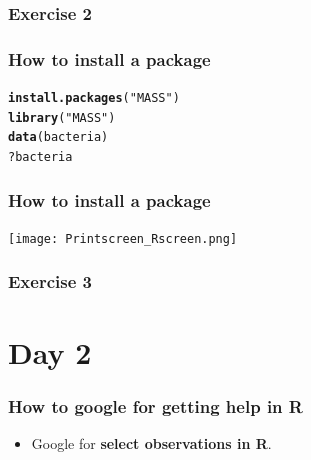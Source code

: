 \documentclass{beamer}\usepackage[]{graphicx}\usepackage[]{color}
\makeatletter
\newcommand{\hlstr}[1]{\textcolor[rgb]{0.192,0.494,0.8}{#1}}%
\newcommand{\hlopt}[1]{\textcolor[rgb]{0,0,0}{#1}}%
\newcommand{\hlstd}[1]{\textcolor[rgb]{0.345,0.345,0.345}{#1}}%
\newcommand{\hlkwd}[1]{\textcolor[rgb]{0.737,0.353,0.396}{\textbf{#1}}}%
\newenvironment{kframe}{%
 \def\at@end@of@kframe{}%
 \ifinner\ifhmode%
  \def\at@end@of@kframe{\end{minipage}}%
  \begin{minipage}{\columnwidth}%
 \fi\fi%
 \def\FrameCommand##1{\hskip\@totalleftmargin \hskip-\fboxsep
 \colorbox{shadecolor}{##1}\hskip-\fboxsep
     \hskip-\linewidth \hskip-\@totalleftmargin \hskip\columnwidth}%
 \MakeFramed {\advance\hsize-\width
   \@totalleftmargin\z@ \linewidth\hsize
   \@setminipage}}%
 {\par\unskip\endMakeFramed%
 \at@end@of@kframe}
\newenvironment{knitrout}{}{} %
\makeatother
\begin{document}
{{%

\begin{frame}
\frametitle{Exercise 2}
\end{frame}


\begin{frame}[fragile]
\frametitle{How to install a package}
\begin{knitrout}\scriptsize
{}\color{fgcolor}\begin{kframe}
\begin{alltt}
\hlkwd{install.packages}\hlstd{(}\hlstr{"MASS"}\hlstd{)}
\hlkwd{library}\hlstd{(}\hlstr{"MASS"}\hlstd{)}
\hlkwd{data}\hlstd{(bacteria)}
\hlopt{?}\hlstd{bacteria}
\end{alltt}
\end{kframe}
\end{knitrout}
\end{frame}


\begin{frame}[fragile]
\frametitle{How to install a package}
\begin{center}
\texttt{[image: Printscreen\_Rscreen.png]}
\end{center}
\end{frame}


\begin{frame}[fragile]
\frametitle{Exercise 3}
\end{frame}

\section{Day 2}
\usebackgroundtemplate{}
\begin{frame}[fragile]
\frametitle{How to google for getting help in R}
\begin{itemize}
\setlength\itemsep{1.5em}
\item Google for \textbf{select observations in R}.
\end{itemize}
\end{frame}

}}
\end{document}
